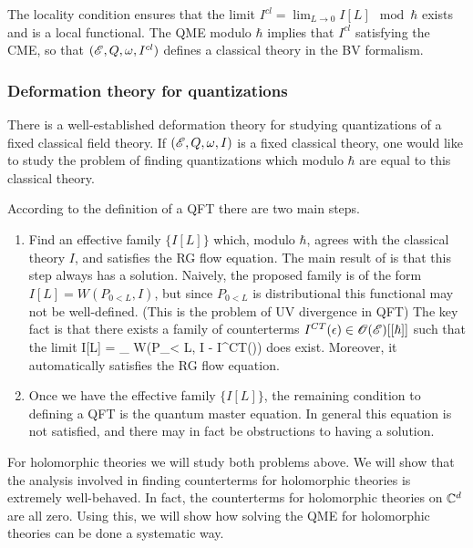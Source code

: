The locality condition ensures that the limit $I^{cl} = \lim_{L \to 0} I[L] \mod \hbar$ exists and is a local functional.
The QME modulo $\hbar$ implies that $I^{cl}$ satisfying the CME, so that $(\mathscr E, Q, \omega, I^{cl})$ defines a classical theory in the BV formalism.

\subsubsection{Deformation theory for quantizations}

There is a well-established deformation theory for studying quantizations of a fixed classical field theory.
If $(\mathscr E, Q, \omega, I)$ is a fixed classical theory, one would like to study the problem of finding quantizations which modulo $\hbar$ are equal to this classical theory. 

According to the definition of a QFT there are two main steps. 

\begin{enumerate}
\item Find an effective family $\{I[L]\}$ which, modulo $\hbar$, agrees with the classical theory $I$, and satisfies the RG flow equation. 
The main result of \cite{CostelloRenormalization} is that this step always has a solution. 
Naively, the proposed family is of the form $I[L] = W(P_{0<L}, I)$, but since $P_{0<L}$ is distributional this functional may not be well-defined. (This is the problem of UV divergence in QFT)
The key fact is that there exists a family of counterterms $I^{CT}(\epsilon) \in \mathscr O(\mathscr E)[[\hbar]]$ such that the limit
\ben
I[L] = \lim_{\epsilon {}} W(P_{\epsilon < L}, I - I^{CT}(\epsilon))
\een
does exist.
Moreover, it automatically satisfies the RG flow equation.
\item Once we have the effective family $\{I[L]\}$, the remaining condition to defining a QFT is the quantum master equation.
In general this equation is not satisfied, and there may in fact be obstructions to having a solution.
\end{enumerate}

For holomorphic theories we will study both problems above.
We will show that the analysis involved in finding counterterms for holomorphic theories is extremely well-behaved. 
In fact, the counterterms for holomorphic theories on $\mathbb C^d$ are all zero.
Using this, we will show how solving the QME for holomorphic theories can be done a systematic way.

